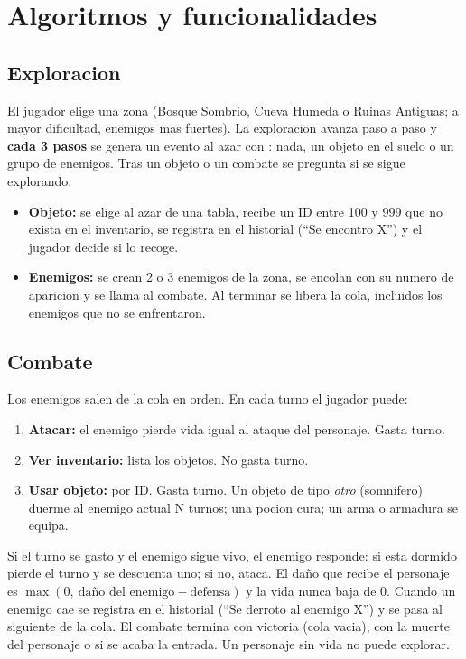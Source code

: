 \documentclass[11pt,a4paper]{article}
\newcommand{\fn}[1]{\texttt{\detokenize{#1}}}
\begin{document}
\section{Algoritmos y funcionalidades}

\subsection{Exploracion}
El jugador elige una zona (Bosque Sombrio, Cueva Humeda o Ruinas Antiguas; a mayor
dificultad, enemigos mas fuertes). La exploracion avanza paso a paso y \textbf{cada 3 pasos}
se genera un evento al azar con \fn{rand() \% 3}: nada, un objeto en el suelo o un
grupo de enemigos. Tras un objeto o un combate se pregunta si se sigue explorando.

\begin{itemize}
  \item \textbf{Objeto:} se elige al azar de una tabla, recibe un ID entre 100 y 999 que no exista en el inventario,
        se registra en el historial (``Se encontro X'') y el jugador decide si lo recoge.
  \item \textbf{Enemigos:} se crean 2 o 3 enemigos de la zona, se encolan con su numero de aparicion y se llama
        al combate. Al terminar se libera la cola, incluidos los enemigos que no se enfrentaron.
\end{itemize}

\subsection{Combate}
Los enemigos salen de la cola en orden. En cada turno el jugador puede:

\begin{enumerate}
  \item \textbf{Atacar:} el enemigo pierde vida igual al ataque del personaje. Gasta turno.
  \item \textbf{Ver inventario:} lista los objetos. No gasta turno.
  \item \textbf{Usar objeto:} por ID. Gasta turno. Un objeto de tipo \emph{otro} (somnifero) duerme al enemigo
        actual N turnos; una pocion cura; un arma o armadura se equipa.
\end{enumerate}

Si el turno se gasto y el enemigo sigue vivo, el enemigo responde: si esta
dormido pierde el turno y se descuenta uno; si no, ataca. El daño que recibe
el personaje es $\max(0,\ \text{daño del enemigo} - \text{defensa})$ y la vida nunca baja de 0.
Cuando un enemigo cae se registra en el historial (``Se derroto al enemigo X'') y se pasa al siguiente de la cola.
El combate termina con victoria (cola vacia), con la muerte del personaje o si se
acaba la entrada. Un personaje sin vida no puede explorar.
\end{document}
